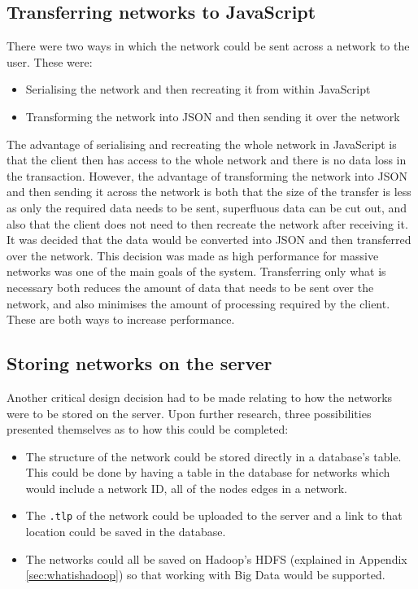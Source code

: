 \documentclass[../dissertation.tex]{subfiles}
\begin{document}
\subsection{Transferring networks to JavaScript}

There were two ways in which the network could be sent across a network to the user. These were:

\begin{itemize}
    \item Serialising the network and then recreating it from within JavaScript
    \item Transforming the network into JSON and then sending it over the network
\end{itemize}

The advantage of serialising and recreating the whole network in JavaScript is that the client then has access to the whole network and there is no data loss in the transaction. However, the advantage of transforming the network into JSON and then sending it across the network is both that the size of the transfer is less as only the required data needs to be sent, superfluous data can be cut out, and also that the client does not need to then recreate the network after receiving it. It was decided that the data would be converted into JSON and then transferred over the network. This decision was made as high performance for massive networks was one of the main goals of the system. Transferring only what is necessary both reduces the amount of data that needs to be sent over the network, and also minimises the amount of processing required by the client. These are both ways to increase performance.

\subsection{Storing networks on the server}

Another critical design decision had to be made relating to how the networks were to be stored on the server. Upon further research, three possibilities presented themselves as to how this could be completed:

\begin{itemize}
    \item The structure of the network could be stored directly in a database's table. This could be done by having a table in the database for networks which would include a network ID, all of the nodes edges in a network.
    \item The \texttt{.tlp} of the network could be uploaded to the server and a link to that location could be saved in the database.
    \item The networks could all be saved on Hadoop's HDFS (explained in Appendix \ref{sec:whatishadoop}) so that working with Big Data would be supported.
\end{itemize}
\end{document}
